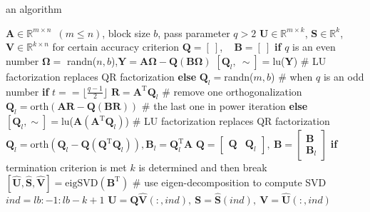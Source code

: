 \documentclass[10pt]{beamer}
\begin{document}
\begin{frame}{an algorithm}
  

  \begin{algorithm}[H]
     \scriptsize
  \begin{algorithmic}[1] %
    \REQUIRE $\mathbf{A}\in\mathbb{R}^{m\times n}$~$(m \le n)$, block size $b$, pass parameter $q > 2$
    \ENSURE $\mathbf{U}\in\mathbb{R}^{m\times k}$, $\mathbf{S}\in\mathbb{R}^k$, $\mathbf{V}\in\mathbb{R}^{k\times n}$ for certain accuracy criterion
      \STATE $\mathbf{Q} = [~ ]$, ~ $\mathbf{B} = [~ ]$
      \STATE \textbf{if} $q$ is an even number
        \STATE \quad\quad$\bm{\Omega}=$ randn($n,b$),$\mathbf{Y}=\mathbf{A}\bm{\Omega}-\mathbf{Q}(\mathbf{B}\bm{\Omega})$
        \STATE \quad\quad$[\mathbf{Q}_l, ~ \sim]=$lu($\mathbf{Y}$) \quad \quad \quad \quad \quad \quad \# LU factorization replaces QR factorization
      \STATE \textbf{else} 
        \STATE \quad\quad$\mathbf{Q}_l=$randn($m,b$) \quad \quad \quad \quad \quad \quad \# when $q$ is an odd number
        \STATE \textbf{if} $t==\lfloor\frac{q-1}{2}\rfloor$
          \STATE \quad\quad$\mathbf{R}=\mathbf{A}^\mathrm{T}\mathbf{Q}_l$ \quad \quad \quad \quad \quad \quad \quad \# remove one orthogonalization 
          \STATE \quad\quad$\mathbf{Q}_l= \mathrm{orth}(\mathbf{A}\mathbf{R}-\mathbf{Q}(\mathbf{B}\mathbf{R}))$ \quad \quad \# the last one in power iteration 
        \STATE \textbf{else}
          \STATE \quad\quad$[\mathbf{Q}_l, \sim] =$lu($\mathbf{A}(\mathbf{A}^\mathrm{T}\mathbf{Q}_l)$) \quad \quad \# LU factorization replaces QR factorization
      \ENDFOR
      \STATE $\mathbf{Q}_l = \mathrm{orth}(\mathbf{Q}_l-\mathbf{Q}(\mathbf{Q}^\mathrm{T}\mathbf{Q}_l)),\mathbf{B}_l=\mathbf{Q}_l^\mathrm{T}\mathbf{A}$
      \STATE $\mathbf{Q}=\begin{bmatrix}\mathbf{Q}&\mathbf{Q}_l\end{bmatrix}, ~ \mathbf{B}=\begin{bmatrix}\mathbf{B}\\\mathbf{B}_l\end{bmatrix}$
    \STATE \textbf{if} {termination criterion is met}
    \STATE \quad\quad$k$ is determined and then break
    \ENDFOR
  \STATE $[\mathbf{\hat{U}},\mathbf{\hat{S}},\mathbf{\hat{V}}] = \mathrm{eigSVD}(\mathbf{B^\mathrm{T}})$ \quad \quad \quad \quad \# use eigen-decomposition to compute SVD
    \STATE $ind=lb:-1:lb-k+1$
  \STATE $\mathbf{U}=\mathbf{Q}\mathbf{\hat{V}}(:, ind),  ~ \mathbf{S}=\mathbf{\hat{S}}(ind), ~ \mathbf{V}=\mathbf{\hat{U}}(:, ind)$
	\end{algorithmic}
\end{algorithm}


\end{frame}
\end{document}
